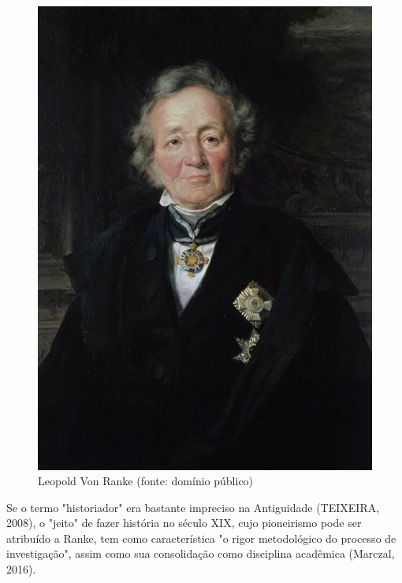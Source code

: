 \captionsetup{format=plain}
\begin{figure}[htb]

\centering


\begin{minipage}[b]{0.4\linewidth}
        \centering
                \includegraphics[width=1.0\linewidth]{../../../imagens/ranke.jpg}
                \caption{Leopold Von Ranke (fonte: domínio público)}
                \label{e978df58deaf86ca4da4073fca97b28afd4d3a3b}
\end{minipage}%
\hspace{0.5cm}
\end{figure}



Se o termo "historiador" era bastante impreciso na Antiguidade (TEIXEIRA, 2008), o "jeito" de fazer história no século XIX, cujo pioneirismo pode ser atribuído a Ranke, tem como característica "o rigor metodológico do processo de investigação", assim como sua consolidação como disciplina acadêmica (Marczal, 2016).

